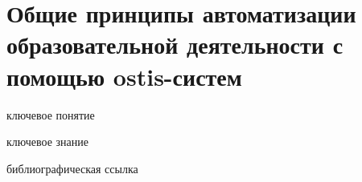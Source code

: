 \section{Общие принципы автоматизации образовательной деятельности с помощью ostis-систем}
\label{sec_general_principles_automation_educational_activities}

\begin{SCn}
	
	\bigskip
	
	\begin{scnrelfromlist}{ключевое понятие}
	\end{scnrelfromlist}
	
	\bigskip
	
	\begin{scnrelfromlist}{ключевое знание}
	\end{scnrelfromlist}
	
	\bigskip
	
	\begin{scnrelfromlist}{библиографическая ссылка}
	\end{scnrelfromlist}
	
\end{SCn}

